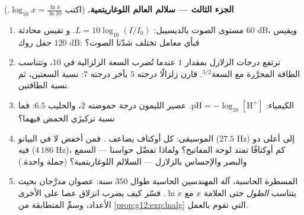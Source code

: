\begin{problem}
\medskip
\noindent\textbf{الجزء الثالث --- سلالم العالم اللوغاريتمية.}
(اكتب $\log_{10} x = \frac{\ln x}{\ln 10}$.)
\begin{enumerate}[resume]
  \item مستوى الصوت بالديسيبل: $L = 10 \log_{10}(I/I_0)$. و
        تقيس محادثة $60$ dB، ويقيس حفل روك $120$ dB:
        فبأي معامل تختلف شدّتا الصوت؟
  \item ترتفع درجات الزلازل بمقدار $1$ عندما تُضرب
        السعة الزلزالية في $10$، وتتناسب الطاقة
        المحرَّرة مع السعة$^{3/2}$. قارن
        زلزالًا درجته $5$ بآخر درجته $7$: نسبة السعتين،
        ثم نسبة الطاقتين.
  \item الكيمياء: $\text{pH} = -\log_{10}[\mathrm{H^+}]$.
        عصير الليمون درجة حموضته $2$، والحليب $6.5$: فما
        نسبة تركيزَي الحمض فيهما؟
  \item الموسيقى: كل أوكتاف يضاعف . فمن
        أخفض لا في البيانو ($27.5$ Hz) إلى أعلى دو فيه
        ($4\,186$ Hz)، كم أوكتافًا تمتد لوحة المفاتيح؟
        ولماذا تفضّل حواسنا --- السمع والبصر والإحساس بالزلازل
        --- السلالم اللوغاريتمية؟ (جملة واحدة.)
  \item المسطرة الحاسبة، آلة المهندسين الحاسبة طوال $350$
        سنة: عصوان مدرَّجان بحيث يتناسب \emph{الطول}
        حتى العلامة $x$ مع $\ln x$. فسّر كيف
        يضرب انزلاق عصا على الأخرى الأعداد،
        وسمِّ المتطابقة من
        \cref{prop:g12:exp:lnalg} التي تقوم بالعمل.
\end{enumerate}


\end{problem}
